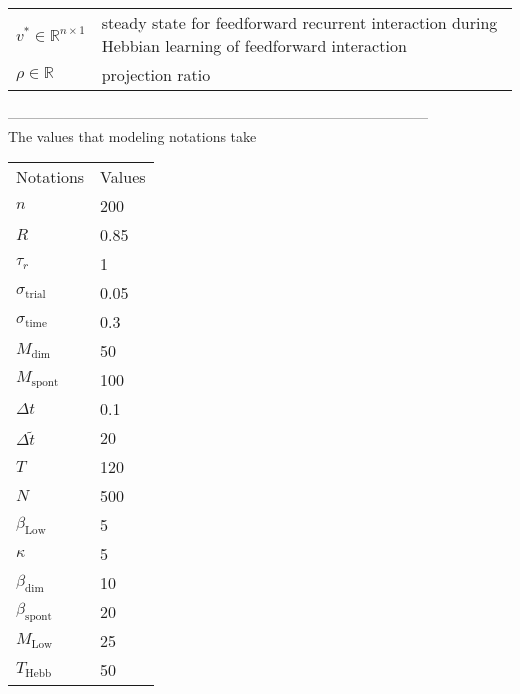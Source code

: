 \documentclass[11pt]{article}
\begin{document}
	\begin{table}[H]
		\begin{tabularx}{\textwidth}{lX}
			$v^* \in \mathbb{R}^{n \times 1}$ & steady state for feedforward recurrent interaction during Hebbian learning of feedforward interaction \\
			
			$\rho \in \mathbb{R}$ & projection ratio \\
			
		\end{tabularx}
	\end{table}
	
	
	------------------------------------------------------------------------------------------\\
	The values that modeling notations take
	\begin{table}[H]
		\begin{tabular}{ll}
			Notations \hspace{0.5cm} & Values \\
			$n$ & 200 \\
			$R$ & 0.85 \\
			$\tau_r$ & 1 \\
			$\sigma_{\text{trial}}$ & 0.05 \\
			$\sigma_{\text{time}}$ & 0.3 \\
			$M_{\text{dim}}$ & 50 \\
			$M_{\text{spont}}$ & 100\\
			$\Delta t$ & 0.1 \\
			$\Delta \tilde{t}$ & 20\\
			$T$ & 120\\
			$N$ & 500 \\
			$\beta_{\text{Low}}$ & 5\\
			$\kappa$ & 5\\
			$\beta_{\text{dim}}$ & 10\\
			$\beta_{\text{spont}}$ & 20\\
			$M_{\text{Low}}$ & 25\\
			$T_{\text{Hebb}}$ & 50 \\
			
		\end{tabular}
	\end{table}
	
\end{document}
